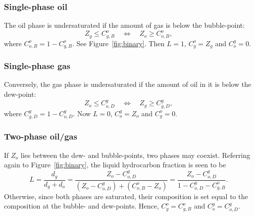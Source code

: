 
\subsubsection{Single-phase oil}

The oil phase is undersaturated if the amount of gas is below the
bubble-point:
\begin{equation}
  Z_g \leq C_{g,B}^o\quad\Leftrightarrow\quad
  Z_o \geq C_{o,B}^o,
\end{equation}
where $C_{o,B}^o=1-C_{g,B}^o$. See Figure~\ref{fig:binary}. Then
$L=1$, $C_g^o=Z_g$ and $C_o^g=0$.


\subsubsection{Single-phase gas}

Conversely, the gas phase is undersaturated if the amount of oil in it
is below the dew-point:
\begin{equation}
  Z_o \leq C_{o,D}^g\quad\Leftrightarrow\quad
  Z_g \geq C_{g,D}^g,
\end{equation}
where $C_{g,D}^g=1-C_{o,D}^g$. Now $L=0$, $C_o^g=Z_o$ and $C_g^o=0$.


\subsubsection{Two-phase oil/gas}

If $Z_o$ lies between the dew- and bubble-points, two phases may
coexist. Referring again to Figure~\ref{fig:binary}, the liquid
hydrocarbon fraction is seen to be
\begin{equation}
  L = \frac{d_g}{d_g + d_o} =
  \frac{Z_o - C_{o,D}^g}{
    \left(Z_o - C_{o,D}^g\right)+
    \left(C_{o,B}^o - Z_o\right)} =
  \frac{Z_o - C_{o,D}^g}{1 - C_{o,D}^g - C_{g,B}^o}.
\end{equation}
Otherwise, since both phases are saturated, their composition is set
equal to the composition at the bubble- and dew-points. Hence,
$C_g^o=C_{g,B}^o$ and $C_o^g=C_{o,D}^g$.


